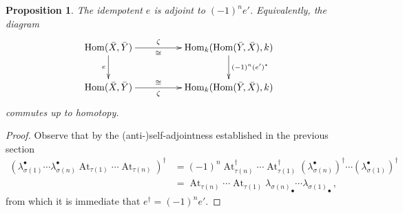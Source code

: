 \documentclass{compositio}
\newtheorem{proposition}[theorem]{Proposition}
\theoremstyle{definition}
\numberwithin{equation}{section}
\def\Hom{\operatorname{Hom}}
\DeclareMathOperator{\At}{At}
\begin{document}
\begin{proposition}\label{prop:eadjointeprime} The idempotent $e$ is adjoint to $(-1)^n e'$. Equivalently, the diagram
\begin{equation}\label{eq:eadjointeprime}
\xymatrix@C+2pc{
\Hom(\bar{X}, \bar{Y}) \ar[d]_-{e} \ar[r]^-{\zeta}_-{\cong} & \Hom_k(\Hom(\bar{Y},\bar{X}),k) \ar[d]^-{(-1)^n (e')^*}\\
\Hom(\bar{X}, \bar{Y}) \ar[r]_-{\zeta}^-{\cong} & \Hom_k( \Hom(\bar{Y}, \bar{X}), k )
}
\end{equation}
commutes up to homotopy.
\end{proposition}
\begin{proof} 
Observe that by the (anti-)self-adjointness established in the previous section
\begin{align*}
\left( \lambda_{\sigma(1)}^\bullet \cdots \lambda_{\sigma(n)}^\bullet \At_{\tau(1)} \cdots \At_{\tau(n)} \right)^{\dagger} &= (-1)^n \At^\dagger_{\tau(n)} \cdots \At^\dagger_{\tau(1)} (\lambda_{\sigma(n)}^\bullet)^\dagger \cdots (\lambda_{\sigma(1)}^\bullet)^{\dagger}\\
&= \At_{\tau(n)} \cdots \At_{\tau(1)} {\lambda_{\sigma(n)}}_{\bullet} \cdots {\lambda_{\sigma(1)}}_{\bullet}\,,
\end{align*}
from which it is immediate that $e^{\dagger} = (-1)^n e'$.
\end{proof}
\end{document}
